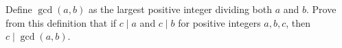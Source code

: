 Define $\gcd(a,b)$ as the largest positive integer dividing both $a$ and $b$. Prove from this definition that if $c\mid a$ and $c\mid b$ for positive integers $a,b,c$, then $c\mid\gcd(a,b)$.
